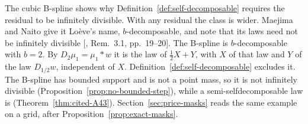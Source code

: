 The cubic B-spline shows why Definition~\ref{def:self-decomposable} requires the residual to be
infinitely divisible. With any residual the class is wider. Maejima and Naito give it Lo\`eve's
name, $b$-decomposable, and note that its laws need not be infinitely divisible
[, Rem.~3.1, pp.~19--20]. The B-spline is $b$-decomposable with $b = 2$. By
$D_2\mu_1 = \mu_1 * w$ it is the law of $\tfrac12X + Y$, with $X$ of that law and $Y$ of the law
$D_{1/2}w$, independent of $X$. Definition~\ref{def:self-decomposable} excludes it. The B-spline has bounded support and is
not a point mass, so it is not infinitely divisible (Proposition~\ref{prop:no-bounded-step}), while
a semi-selfdecomposable law is (Theorem~\ref{thm:cited-A43}). Section~\ref{sec:price-masks} reads
the same example on a grid, after Proposition~\ref{prop:exact-masks}.


